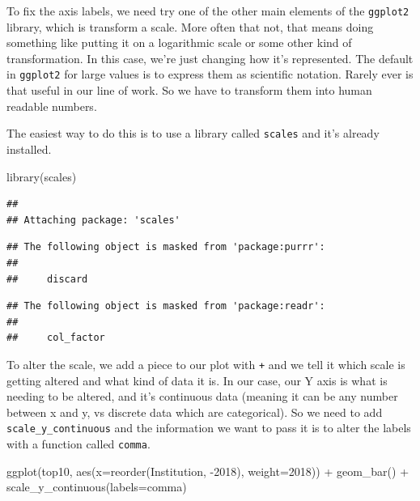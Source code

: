 \documentclass[
]{book}
\newenvironment{Shaded}{\begin{snugshade}}{\end{snugshade}}
\newcommand{\AttributeTok}[1]{\textcolor[rgb]{0.77,0.63,0.00}{#1}}
\newcommand{\FunctionTok}[1]{\textcolor[rgb]{0.00,0.00,0.00}{#1}}
\newcommand{\NormalTok}[1]{#1}
\newcommand{\SpecialCharTok}[1]{\textcolor[rgb]{0.00,0.00,0.00}{#1}}
\newcommand{\StringTok}[1]{\textcolor[rgb]{0.31,0.60,0.02}{#1}}
\begin{document}
To fix the axis labels, we need try one of the other main elements of the \texttt{ggplot2} library, which is transform a scale. More often that not, that means doing something like putting it on a logarithmic scale or some other kind of transformation. In this case, we're just changing how it's represented. The default in \texttt{ggplot2} for large values is to express them as scientific notation. Rarely ever is that useful in our line of work. So we have to transform them into human readable numbers.

The easiest way to do this is to use a library called \texttt{scales} and it's already installed.

\begin{Shaded}
\begin{Highlighting}[]
\FunctionTok{library}\NormalTok{(scales)}
\end{Highlighting}
\end{Shaded}

\begin{verbatim}
## 
## Attaching package: 'scales'
\end{verbatim}

\begin{verbatim}
## The following object is masked from 'package:purrr':
## 
##     discard
\end{verbatim}

\begin{verbatim}
## The following object is masked from 'package:readr':
## 
##     col_factor
\end{verbatim}

To alter the scale, we add a piece to our plot with \texttt{+} and we tell it which scale is getting altered and what kind of data it is. In our case, our Y axis is what is needing to be altered, and it's continuous data (meaning it can be any number between x and y, vs discrete data which are categorical). So we need to add \texttt{scale\_y\_continuous} and the information we want to pass it is to alter the labels with a function called \texttt{comma}.

\begin{Shaded}
\begin{Highlighting}[]
\FunctionTok{ggplot}\NormalTok{(top10, }\FunctionTok{aes}\NormalTok{(}\AttributeTok{x=}\FunctionTok{reorder}\NormalTok{(Institution, }\SpecialCharTok{{-}}\StringTok{\textasciigrave{}}\AttributeTok{2018}\StringTok{\textasciigrave{}}\NormalTok{), }\AttributeTok{weight=}\StringTok{\textasciigrave{}}\AttributeTok{2018}\StringTok{\textasciigrave{}}\NormalTok{)) }\SpecialCharTok{+} 
  \FunctionTok{geom\_bar}\NormalTok{() }\SpecialCharTok{+} 
  \FunctionTok{scale\_y\_continuous}\NormalTok{(}\AttributeTok{labels=}\NormalTok{comma)}
\end{Highlighting}
\end{Shaded}
\end{document}
